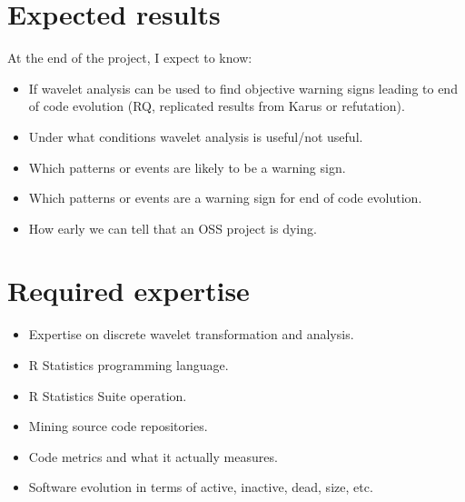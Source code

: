


\section{Expected results}
At the end of the project, I expect to know:
\begin{itemize}
	\item If wavelet analysis can be used to find objective warning signs leading
	to end of code evolution (RQ, replicated results from Karus or refutation).
	\item Under what conditions wavelet analysis is useful/not useful.
	\item Which patterns or events are likely to be a warning sign.
	\item Which patterns or events are a warning sign for end of code evolution.
	\item How early we can tell that an OSS project is dying.
\end{itemize}

\section{Required expertise}
\begin{itemize}
	\item Expertise on discrete wavelet transformation and analysis.
	\item R Statistics programming language.
	\item R Statistics Suite operation.
	\item Mining source code repositories.
	\item Code metrics and what it actually measures.
	\item Software evolution in terms of active, inactive, dead, size, etc.
\end{itemize}

